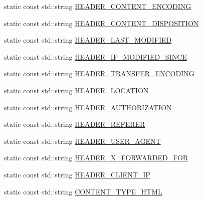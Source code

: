 \begin{DoxyCompactItemize}
\item 
static const std\-::string \hyperlink{structpion_1_1http_1_1types_aed13bd484d84e216c96b056fea7a7527}{H\-E\-A\-D\-E\-R\-\_\-\-C\-O\-N\-T\-E\-N\-T\-\_\-\-E\-N\-C\-O\-D\-I\-N\-G}
\item 
static const std\-::string \hyperlink{structpion_1_1http_1_1types_a514e757b37679add3b57c88209e46ab3}{H\-E\-A\-D\-E\-R\-\_\-\-C\-O\-N\-T\-E\-N\-T\-\_\-\-D\-I\-S\-P\-O\-S\-I\-T\-I\-O\-N}
\item 
static const std\-::string \hyperlink{structpion_1_1http_1_1types_a9873e0461ffbdace4e7d6cbe007ba3ed}{H\-E\-A\-D\-E\-R\-\_\-\-L\-A\-S\-T\-\_\-\-M\-O\-D\-I\-F\-I\-E\-D}
\item 
static const std\-::string \hyperlink{structpion_1_1http_1_1types_a33ecae14c2b1ab25c04a823e14571d7c}{H\-E\-A\-D\-E\-R\-\_\-\-I\-F\-\_\-\-M\-O\-D\-I\-F\-I\-E\-D\-\_\-\-S\-I\-N\-C\-E}
\item 
static const std\-::string \hyperlink{structpion_1_1http_1_1types_a3b39d44f38cbc04b75cfd4d9c0e5b18a}{H\-E\-A\-D\-E\-R\-\_\-\-T\-R\-A\-N\-S\-F\-E\-R\-\_\-\-E\-N\-C\-O\-D\-I\-N\-G}
\item 
static const std\-::string \hyperlink{structpion_1_1http_1_1types_a3d86eec9408f000aa26f84f7f6e4a098}{H\-E\-A\-D\-E\-R\-\_\-\-L\-O\-C\-A\-T\-I\-O\-N}
\item 
static const std\-::string \hyperlink{structpion_1_1http_1_1types_a631e29eb1f859c41ae65a6a2861e60ac}{H\-E\-A\-D\-E\-R\-\_\-\-A\-U\-T\-H\-O\-R\-I\-Z\-A\-T\-I\-O\-N}
\item 
static const std\-::string \hyperlink{structpion_1_1http_1_1types_a39efd8df51b418623d822f156b4b7e05}{H\-E\-A\-D\-E\-R\-\_\-\-R\-E\-F\-E\-R\-E\-R}
\item 
static const std\-::string \hyperlink{structpion_1_1http_1_1types_af910e9d9d8748d77d5f3a5b79c459b77}{H\-E\-A\-D\-E\-R\-\_\-\-U\-S\-E\-R\-\_\-\-A\-G\-E\-N\-T}
\item 
static const std\-::string \hyperlink{structpion_1_1http_1_1types_ab9ddd93284acb0162b389e465708fb1d}{H\-E\-A\-D\-E\-R\-\_\-\-X\-\_\-\-F\-O\-R\-W\-A\-R\-D\-E\-D\-\_\-\-F\-O\-R}
\item 
static const std\-::string \hyperlink{structpion_1_1http_1_1types_abdbd353ba458a132ef432bcbffa02f75}{H\-E\-A\-D\-E\-R\-\_\-\-C\-L\-I\-E\-N\-T\-\_\-\-I\-P}
\item 
static const std\-::string \hyperlink{structpion_1_1http_1_1types_a02850c07dccf6c375ee662bb46cbcfed}{C\-O\-N\-T\-E\-N\-T\-\_\-\-T\-Y\-P\-E\-\_\-\-H\-T\-M\-L}
\item 

\end{DoxyCompactItemize}
